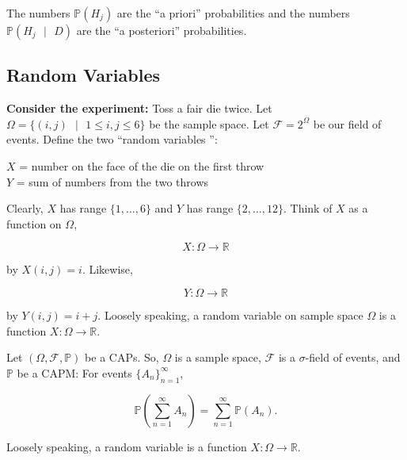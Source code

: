 \documentclass[12pt]{article}
\newcommand{\R}{\mathbb{R}}
\newcommand{\faps}{(\Omega, \field, \mathbb{P})}
\newcommand{\field}{\mathcal{F}}
\newcommand{\prob}[1]{\mathbb{P}(#1)}
\newcommand{\condprob}[2]{\mathbb{P}(#1 \text{ } \lvert \text{ } #2)}
\newcommand{\nspace}{\vspace*{.5cm}}
\begin{document}
\nspace
\noindent
The numbers $\prob{H_j}$ are the ``a priori'' probabilities and the numbers $\condprob{H_j}{D}$ are the ``a posteriori'' probabilities.

\vspace*{.5cm}
\subsection*{Random Variables}

\begin{tcolorbox}
\textbf{Consider the experiment:} Toss a fair die twice. Let $\Omega = \big \{ (i,j) \text{ } \lvert \text{ } 1 \leq i, j \leq 6 \big \}$ be the sample space. Let $\mathcal{F} = 2^{\Omega}$ be our field of events. Define the two ``random variables '': 

\begin{adjustwidth}{2.5em}{0pt}
$X$ = number on the face of the die on the first throw \\
$Y$ = sum of numbers from the two throws
\end{adjustwidth}

Clearly, $X$ has range $\big \{ 1, \ldots, 6 \big \}$ and $Y$ has range $\big \{ 2, \ldots, 12 \big \}$. Think of $X$ as a function on $\Omega$,

\begin{equation*}
X : \Omega \rightarrow \R
\end{equation*}

\noindent
by $X(i,j) = i$. Likewise, 

\begin{equation*}
Y: \Omega \rightarrow \R
\end{equation*}

\noindent
by $Y(i,j) = i+j$. Loosely speaking, a random variable on sample space $\Omega$ is a function $X : \Omega \rightarrow \R$.
\end{tcolorbox}

\noindent
Let $\faps$ be a CAPs. So, $\Omega$ is a sample space, $\field$ is a $\sigma$-field of events, and $\mathbb{P}$ be a CAPM: For events $\{ A_n \}_{n=1}^{\infty}$, 

\begin{equation*}
\mathbb{P}( \sum_{n=1}^{\infty} A_n ) = \sum_{n = 1}^{\infty} \prob{A_n}.
\end{equation*}

\noindent
Loosely speaking, a random variable is a function $X : \Omega \rightarrow \R$. 
\end{document}
